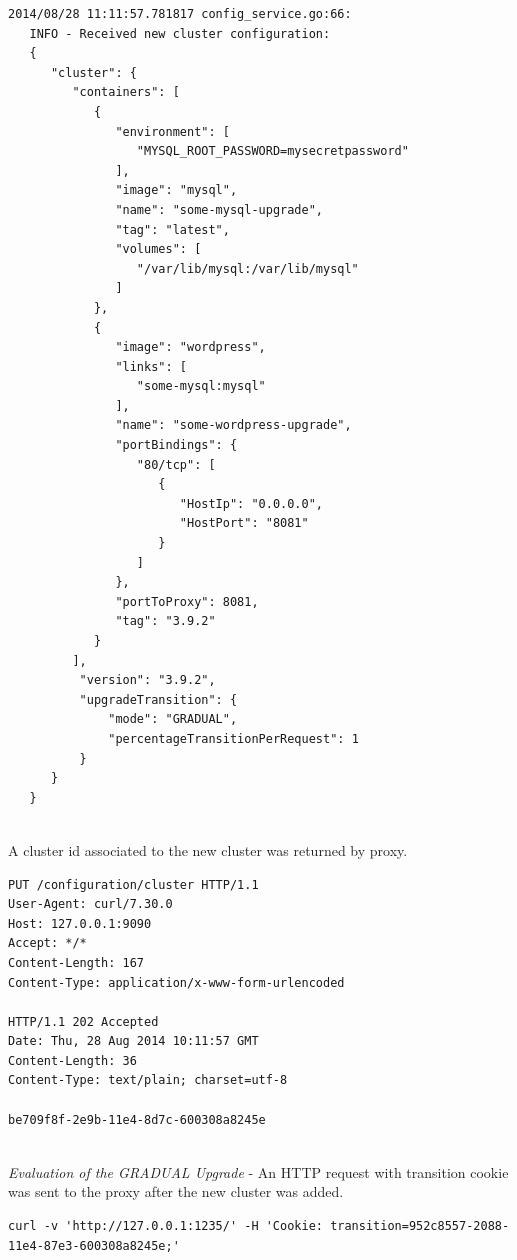 \documentclass[a4paper,11pt,twoside]{report}
\begin{document}
\begin{lstlisting}[language=terminal]
2014/08/28 11:11:57.781817 config_service.go:66:     
   INFO - Received new cluster configuration:
   {
      "cluster": {
         "containers": [
            {
               "environment": [
                  "MYSQL_ROOT_PASSWORD=mysecretpassword"
               ],
               "image": "mysql",
               "name": "some-mysql-upgrade",
               "tag": "latest",
               "volumes": [
                  "/var/lib/mysql:/var/lib/mysql"
               ]
            },
            {
               "image": "wordpress",
               "links": [
                  "some-mysql:mysql"
               ],
               "name": "some-wordpress-upgrade",
               "portBindings": {
                  "80/tcp": [
                     {
                        "HostIp": "0.0.0.0",
                        "HostPort": "8081"
                     }
                  ]
               },
               "portToProxy": 8081,
               "tag": "3.9.2"
            }
         ],
          "version": "3.9.2", 
          "upgradeTransition": {
              "mode": "GRADUAL", 
              "percentageTransitionPerRequest": 1
          }
      }
   }
\end{lstlisting}

\noindent\\ 
A cluster id associated to the new cluster was returned by proxy.\smallskip

\begin{lstlisting}[language=terminal]
PUT /configuration/cluster HTTP/1.1
User-Agent: curl/7.30.0
Host: 127.0.0.1:9090
Accept: */*
Content-Length: 167
Content-Type: application/x-www-form-urlencoded
 
HTTP/1.1 202 Accepted
Date: Thu, 28 Aug 2014 10:11:57 GMT
Content-Length: 36
Content-Type: text/plain; charset=utf-8
 
be709f8f-2e9b-11e4-8d7c-600308a8245e
\end{lstlisting}

\noindent\\
\textit{Evaluation of the GRADUAL Upgrade} - An HTTP request with transition cookie was sent to the proxy after the new cluster was added.\smallskip

\begin{lstlisting}[language=terminal]
curl -v 'http://127.0.0.1:1235/' -H 'Cookie: transition=952c8557-2088-11e4-87e3-600308a8245e;'
\end{lstlisting}
\end{document}
